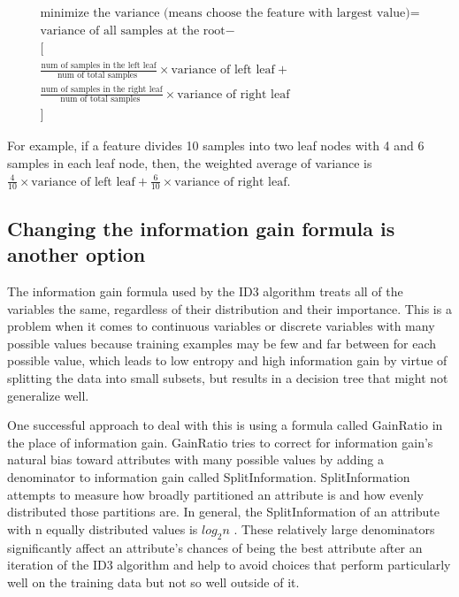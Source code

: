\documentclass[12pt]{report}
\begin{document}
\begin{multline}
	\text{minimize the variance (means choose the feature with largest value)} = \\
	\text{variance of all samples at the root} - \\
	\big[ \\
	\frac{\text{num of samples in the left leaf}}{ \text{num of total samples }} \times \text{variance of left leaf} +\\
	\frac{\text{num of samples in the right leaf}}{ \text{num of total samples }} \times \text{variance of right leaf}\\
	\big]
\end{multline}



For example, if a feature divides 10 samples into two leaf nodes with 4 and 6 samples in each leaf node, then, the weighted average of variance is $\frac{4}{10} \times \text{variance of left leaf} + \frac{6}{10} \times \text{variance of right leaf} $.

\subsection{Changing the information gain formula is another option}
The information gain formula used by the ID3 algorithm treats all of the variables the same, regardless of their distribution and their importance. This is a problem when it comes to continuous variables or discrete variables with many possible values because training examples may be few and far between for each possible value, which leads to low entropy and high information gain by virtue of splitting the data into small subsets, but results in a decision tree that might not generalize well.

One successful approach to deal with this is using a formula called GainRatio in the place of information gain. GainRatio tries to correct for information gain’s natural bias toward attributes with many possible values by adding a denominator to information gain called SplitInformation. SplitInformation attempts to measure how broadly partitioned an attribute is and how evenly distributed those partitions are. In general, the SplitInformation of an attribute with n equally ­distributed values is $log_2 n$ . These relatively large denominators significantly affect an attribute’s chances of being the best attribute after an iteration of the ID3 algorithm and help to avoid choices that perform particularly well on the training data but not so well outside of it.
\end{document}
